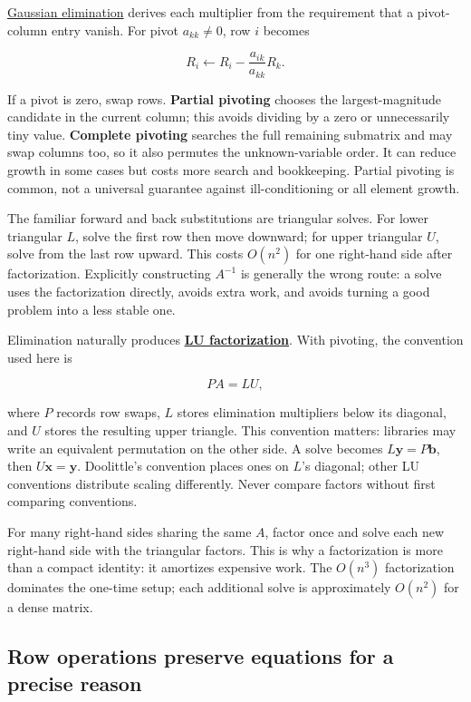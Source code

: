 \hyperref[01-foundations-i-ch019]{Gaussian elimination} derives each multiplier from the requirement that a pivot-column entry vanish. For pivot \(a_{kk}\ne0\), row \(i\) becomes

\[
R_i\leftarrow R_i-\frac{a_{ik}}{a_{kk}}R_k.
\]

If a pivot is zero, swap rows. \textbf{Partial pivoting} chooses the largest-magnitude candidate in the current column; this avoids dividing by a zero or unnecessarily tiny value. \textbf{Complete pivoting} searches the full remaining submatrix and may swap columns too, so it also permutes the unknown-variable order. It can reduce growth in some cases but costs more search and bookkeeping. Partial pivoting is common, not a universal guarantee against ill-conditioning or all element growth.

The familiar forward and back substitutions are triangular solves. For lower triangular \(L\), solve the first row then move downward; for upper triangular \(U\), solve from the last row upward. This costs \(O(n^2)\) for one right-hand side after factorization. Explicitly constructing \(A^{-1}\) is generally the wrong route: a solve uses the factorization directly, avoids extra work, and avoids turning a good problem into a less stable one.

Elimination naturally produces \textbf{\hyperref[01-foundations-i-ch019]{LU factorization}}. With pivoting, the convention used here is

\[
PA=LU,
\]

where \(P\) records row swaps, \(L\) stores elimination multipliers below its diagonal, and \(U\) stores the resulting upper triangle. This convention matters: libraries may write an equivalent permutation on the other side. A solve becomes \(L\mathbf y=P\mathbf b\), then \(U\mathbf x=\mathbf y\). Doolittle's convention places ones on \(L\)'s diagonal; other LU conventions distribute scaling differently. Never compare factors without first comparing conventions.

For many right-hand sides sharing the same \(A\), factor once and solve each new right-hand side with the triangular factors. This is why a factorization is more than a compact identity: it amortizes expensive work. The \(O(n^3)\) factorization dominates the one-time setup; each additional solve is approximately \(O(n^2)\) for a dense matrix.

\subsection{Row operations preserve equations for a precise reason}\label{row-operations-preserve-equations-for-a-precise-reason}

